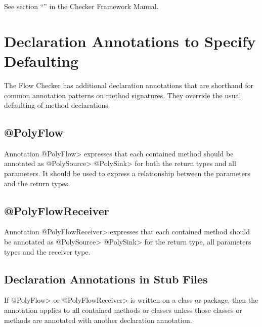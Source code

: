 See section ``'' in the Checker Framework Manual.  




\section{Declaration Annotations to Specify Defaulting\label{sec:addtionalanno}}

The Flow Checker has additional declaration annotations that are shorthand for common 
annotation patterns on method signatures.   They override the usual defaulting of method declarations.

\subsection{@PolyFlow\label{sec:polyflow}}

Annotation \<@PolyFlow> expresses that each contained method should be annotated as \<@PolySource> 
\<@PolySink> for both the return types and all parameters. It should be used to express a relationship 
between the parameters and the return types.


\subsection{@PolyFlowReceiver\label{sec:polyflowreceiver}}

Annotation \<@PolyFlowReceiver> expresses that each contained method should be annotated as \<@PolySource> \<@PolySink> for the return type, all parameters types and the receiver type.

\subsection{Declaration Annotations in Stub Files\label{sec:declannosstubfiles}}
If \<@PolyFlow> or \<@PolyFlowReceiver> is written on a class or package, then the annotation applies
 to all contained methods or classes unless those classes or methods are annotated with another 
 declaration annotation.   


